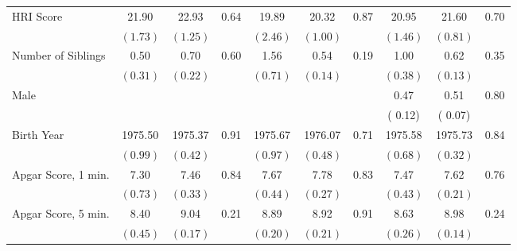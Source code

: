 \begin{tabular}{l c c c c c c c c c}
HRI Score &     21.90 &     22.93 &      0.64 &     19.89 &     20.32 &      0.87 &     20.95 &     21.60 &      0.70 \\
     & $ (     1.73) $ & $ (     1.25) $  & & $ (     2.46) $ & $ (     1.00) $ & & $ (     1.46) $ & $ (     0.81) $  & \\
Number of Siblings &      0.50 &      0.70 &      0.60 &      1.56 &      0.54 &      0.19 &      1.00 &      0.62 &      0.35 \\
     & $ (     0.31) $ & $ (     0.22) $  & & $ (     0.71) $ & $ (     0.14) $ & & $ (     0.38) $ & $ (     0.13) $  & \\
Male &  &  &  & &  &  &      0.47 &      0.51 &      0.80 \\
&  & & & &  & & (     0.12) & (     0.07)  & \\
Birth Year &   1975.50 &   1975.37 &      0.91 &   1975.67 &   1976.07 &      0.71 &   1975.58 &   1975.73 &      0.84 \\
     & $ (     0.99) $ & $ (     0.42) $  & & $ (     0.97) $ & $ (     0.48) $ & & $ (     0.68) $ & $ (     0.32) $  & \\
Apgar Score, 1 min. &      7.30 &      7.46 &      0.84 &      7.67 &      7.78 &      0.83 &      7.47 &      7.62 &      0.76 \\
     & $ (     0.73) $ & $ (     0.33) $  & & $ (     0.44) $ & $ (     0.27) $ & & $ (     0.43) $ & $ (     0.21) $  & \\
Apgar Score, 5 min. &      8.40 &      9.04 &      0.21 &      8.89 &      8.92 &      0.91 &      8.63 &      8.98 &      0.24 \\
     & $ (     0.45) $ & $ (     0.17) $  & & $ (     0.20) $ & $ (     0.21) $ & & $ (     0.26) $ & $ (     0.14) $  & \\
\bottomrule
\end{tabular}